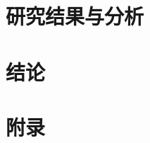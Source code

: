 \documentclass[lang=cn,22pt,a4paper]{elegantpaper}
\begin{document}
    \section{研究结果与分析}\label{sec:results}
	
	\newpage
	\section{结论} \label{sec:conclusion}
	
	\newpage
%	
%	
	\nocite{*}
	\printbibliography[heading=bibintoc, title=\ebibname]
	\newpage
	\appendix
	\section{附录} \label{sec:appendix}
	
	\addappheadtotoc
\end{document}
